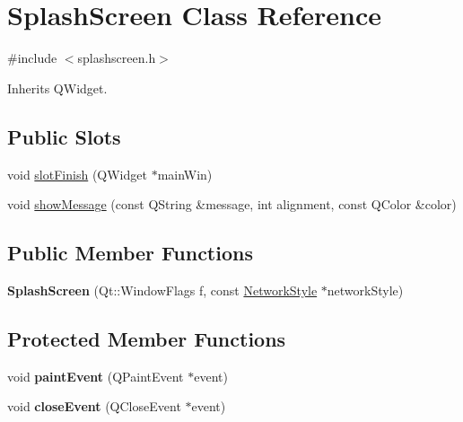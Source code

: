 \hypertarget{class_splash_screen}{}\section{Splash\+Screen Class Reference}
\label{class_splash_screen}


{\ttfamily \#include $<$splashscreen.\+h$>$}



Inherits Q\+Widget.

\subsection*{Public Slots}
\begin{DoxyCompactItemize}
\item 
void \mbox{\hyperlink{class_splash_screen_ace6374d1889d704d4a41316540d9b47d}{slot\+Finish}} (Q\+Widget $\ast$main\+Win)
\item 
void \mbox{\hyperlink{class_splash_screen_a16635123e7906390e0aedb7d58ba9923}{show\+Message}} (const Q\+String \&message, int alignment, const Q\+Color \&color)
\end{DoxyCompactItemize}
\subsection*{Public Member Functions}
\begin{DoxyCompactItemize}
\item 
\mbox{\label{class_splash_screen_aa6f816612e26f1fec23e428b0f290c2d}} 
{\bfseries Splash\+Screen} (Qt\+::\+Window\+Flags f, const \mbox{\hyperlink{class_network_style}{Network\+Style}} $\ast$network\+Style)
\end{DoxyCompactItemize}
\subsection*{Protected Member Functions}
\begin{DoxyCompactItemize}
\item 
\mbox{\label{class_splash_screen_a1115e128bccb82b9a5391540aa87f3c5}} 
void {\bfseries paint\+Event} (Q\+Paint\+Event $\ast$event)
\item 
\mbox{\label{class_splash_screen_af2b8ee5e860e5584621eb6224ce7c959}} 
void {\bfseries close\+Event} (Q\+Close\+Event $\ast$event)
\end{DoxyCompactItemize}


